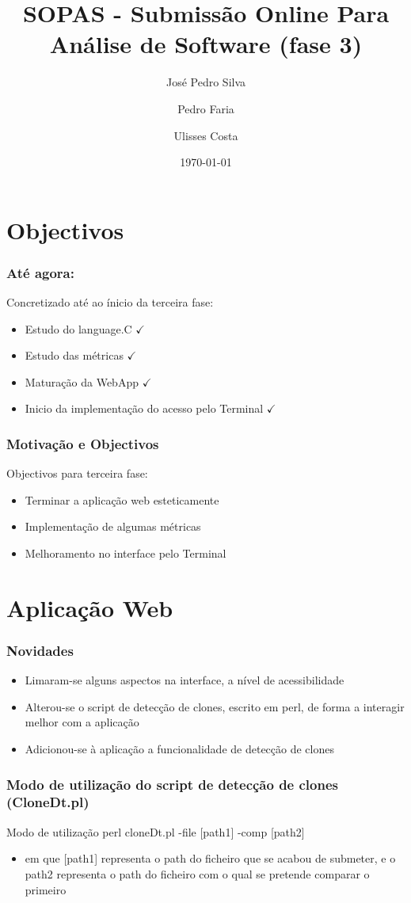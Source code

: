 \documentclass{beamer}
\title{SOPAS - Submissão Online Para Análise de Software (fase 3)}
\author{José Pedro Silva \and
Pedro Faria \and
Ulisses Costa
}
\date{\today}
\institute{Engenharia de Linguagens\\
Projecto integrado
}
\begin{document}
\begin{frame}
   \titlepage
\end{frame}

\section{Objectivos}
\begin{frame} \frametitle{Até agora:}
Concretizado até ao ínicio da terceira fase:
\begin{itemize}
\item Estudo do language.C {\color{green}$\checkmark$}
\item Estudo das métricas {\color{green}$\checkmark$}
\item Maturação da WebApp {\color{green}$\checkmark$}
\item Inicio da implementação do acesso pelo Terminal {\color{green}$\checkmark$}
\end{itemize}
\end{frame}

\begin{frame} \frametitle{Motivação e Objectivos}
Objectivos para terceira fase:
\begin{itemize}
\item Terminar a aplicação web esteticamente
\item Implementação de algumas métricas
\item Melhoramento no interface pelo Terminal
\end{itemize}
\end{frame}

\section{Aplicação Web}
\begin{frame}[fragile] \frametitle{Novidades}
\begin{itemize}
\item Limaram-se alguns aspectos na interface, a nível de acessibilidade
\item Alterou-se o script de detecção de clones, escrito em perl, de forma a interagir melhor com a aplicação
\item Adicionou-se à aplicação a funcionalidade de detecção de clones
\end{itemize}
\end{frame}

\begin{frame}[fragile] \frametitle{Modo de utilização do script de detecção de clones (CloneDt.pl)}
\begin{block}{Modo de utilização}
perl cloneDt.pl -file [path1] -comp [path2]
\end{block}
\begin{itemize}
\item em que [path1] representa o path do ficheiro que se acabou de submeter, e o path2 representa o path do ficheiro com o qual se pretende comparar o primeiro 
\end{itemize}
\end{frame}
\end{document}
